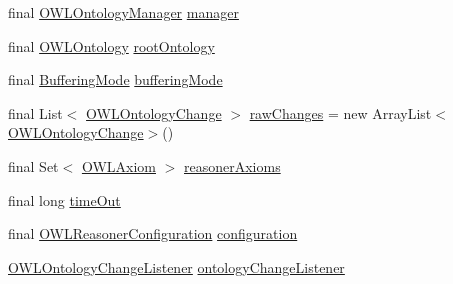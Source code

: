 \begin{DoxyCompactItemize}
\item 
final \hyperlink{interfaceorg_1_1semanticweb_1_1owlapi_1_1model_1_1_o_w_l_ontology_manager}{O\-W\-L\-Ontology\-Manager} \hyperlink{classorg_1_1semanticweb_1_1owlapi_1_1reasoner_1_1impl_1_1_o_w_l_reasoner_base_a1eada6c0b2063563ce8f08899a56cf24}{manager}
\item 
final \hyperlink{interfaceorg_1_1semanticweb_1_1owlapi_1_1model_1_1_o_w_l_ontology}{O\-W\-L\-Ontology} \hyperlink{classorg_1_1semanticweb_1_1owlapi_1_1reasoner_1_1impl_1_1_o_w_l_reasoner_base_a7fc931cb266522a2e131763fb69a02c4}{root\-Ontology}
\item 
final \hyperlink{enumorg_1_1semanticweb_1_1owlapi_1_1reasoner_1_1_buffering_mode}{Buffering\-Mode} \hyperlink{classorg_1_1semanticweb_1_1owlapi_1_1reasoner_1_1impl_1_1_o_w_l_reasoner_base_a37f5f012eabc861364519447692648c0}{buffering\-Mode}
\item 
final List$<$ \hyperlink{classorg_1_1semanticweb_1_1owlapi_1_1model_1_1_o_w_l_ontology_change}{O\-W\-L\-Ontology\-Change} $>$ \hyperlink{classorg_1_1semanticweb_1_1owlapi_1_1reasoner_1_1impl_1_1_o_w_l_reasoner_base_a88633d3c0db97fcf0f3b6c52ea361be0}{raw\-Changes} = new Array\-List$<$\hyperlink{classorg_1_1semanticweb_1_1owlapi_1_1model_1_1_o_w_l_ontology_change}{O\-W\-L\-Ontology\-Change}$>$()
\item 
final Set$<$ \hyperlink{interfaceorg_1_1semanticweb_1_1owlapi_1_1model_1_1_o_w_l_axiom}{O\-W\-L\-Axiom} $>$ \hyperlink{classorg_1_1semanticweb_1_1owlapi_1_1reasoner_1_1impl_1_1_o_w_l_reasoner_base_a2132aa6fe36530631d9e22949bb753bf}{reasoner\-Axioms}
\item 
final long \hyperlink{classorg_1_1semanticweb_1_1owlapi_1_1reasoner_1_1impl_1_1_o_w_l_reasoner_base_a158858c0f8f7e4087bdbac071367dd90}{time\-Out}
\item 
final \hyperlink{interfaceorg_1_1semanticweb_1_1owlapi_1_1reasoner_1_1_o_w_l_reasoner_configuration}{O\-W\-L\-Reasoner\-Configuration} \hyperlink{classorg_1_1semanticweb_1_1owlapi_1_1reasoner_1_1impl_1_1_o_w_l_reasoner_base_a4cbc08a1cf3914d8e9ab79c2236c4a88}{configuration}
\item 
\hyperlink{interfaceorg_1_1semanticweb_1_1owlapi_1_1model_1_1_o_w_l_ontology_change_listener}{O\-W\-L\-Ontology\-Change\-Listener} \hyperlink{classorg_1_1semanticweb_1_1owlapi_1_1reasoner_1_1impl_1_1_o_w_l_reasoner_base_a92d26af9ab3ec3d9a65f32abb95631bb}{ontology\-Change\-Listener}
\end{DoxyCompactItemize}


